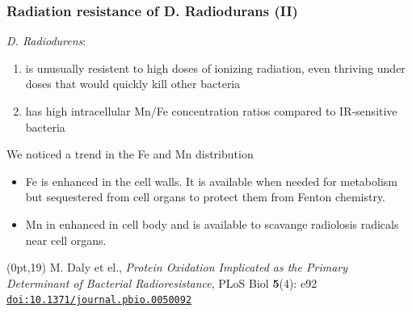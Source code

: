 \begin{frame}
  \frametitle{Radiation resistance of D. Radiodurans (II)}

  \textit{D. Radiodurens}:
  \begin{enumerate}
  \item is unusually resistent to high doses of ionizing radiation, even
    thriving under doses that would quickly kill other bacteria
  \item has high intracellular Mn/Fe concentration ratios compared to
    IR-sensitive bacteria
  \end{enumerate}

  \bigskip
  
  \begin{block}{We noticed a trend in the Fe and Mn distribution}
    \begin{itemize}
    \item Fe is enhanced in the cell walls.  It is available when
      needed for metabolism but sequestered from cell organs to
      protect them from Fenton chemistry.
    \item Mn in enhanced in cell body and is available to scavange
      radiolosis radicals near cell organs.
    \end{itemize}
  \end{block}

  \bigskip

  \begin{textblock*}{0.5\linewidth}(0pt,19\TPVertModule)
    \tiny M. Daly et el., \textit{Protein Oxidation Implicated as the
      Primary Determinant of Bacterial Radioresistance}, PLoS
    Biol \textbf{5}(4): e92
    \href{http://dx.doi.org/10.1371/journal.pbio.0050092}
    {\color{Blue4}\texttt{doi:10.1371/journal.pbio.0050092}}
  \end{textblock*}
\end{frame}

